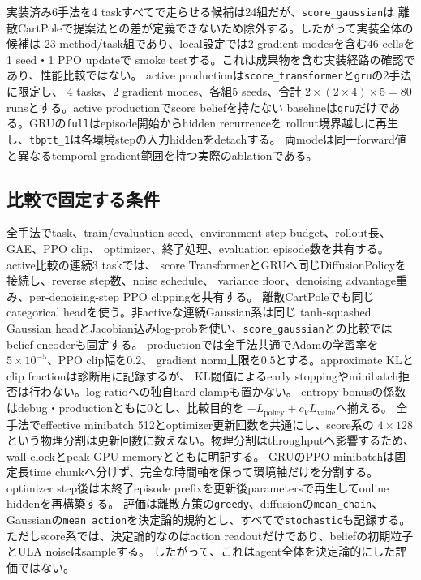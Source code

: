 \documentclass[a4paper,11pt]{article}
\begin{document}
実装済み6手法を4 taskすべてで走らせる候補は24組だが、\texttt{score\_gaussian}は
離散CartPoleで提案法との差が定義できないため除外する。したがって実装全体の候補は
23 method/task組であり、local設定では2 gradient modesを含む46 cellsを1 seed・1 PPO updateで
smoke testする。これは成果物を含む実装経路の確認であり、性能比較ではない。
active productionは\texttt{score\_transformer}と\texttt{gru}の2手法に限定し、
4 tasks、2 gradient modes、各組5 seeds、合計
$2\times(2\times4)\times5=80$ runsとする。active productionでscore beliefを持たない
baselineは\texttt{gru}だけである。GRUの\texttt{full}はepisode開始からhidden recurrenceを
rollout境界越しに再生し、\texttt{tbptt\_1}は各環境stepの入力hiddenをdetachする。
両modeは同一forward値と異なるtemporal gradient範囲を持つ実際のablationである。

\subsection{比較で固定する条件}

全手法でtask、train/evaluation seed、environment step budget、rollout長、GAE、PPO clip、
optimizer、終了処理、evaluation episode数を共有する。active比較の連続3 taskでは、
score TransformerとGRUへ同じDiffusionPolicyを接続し、reverse step数、noise schedule、
variance floor、denoising advantage重み、per-denoising-step PPO clippingを共有する。
離散CartPoleでも同じcategorical headを使う。非activeな連続Gaussian系は同じ
tanh-squashed Gaussian headとJacobian込みlog-probを使い、\texttt{score\_gaussian}との比較では
belief encoderも固定する。
productionでは全手法共通でAdamの学習率を$5\times10^{-5}$、PPO clip幅を$0.2$、
gradient norm上限を$0.5$とする。approximate KLとclip fractionは診断用に記録するが、
KL閾値によるearly stoppingやminibatch拒否は行わない。log ratioへの独自hard clampも置かない。
entropy bonusの係数はdebug・productionともに0とし、比較目的を
$-L_{\mathrm{policy}}+c_VL_{\mathrm{value}}$へ揃える。
全手法でeffective minibatch 512とoptimizer更新回数を共通にし、score系の
$4\times128$という物理分割は更新回数に数えない。物理分割はthroughputへ影響するため、
wall-clockとpeak GPU memoryとともに明記する。
GRUのPPO minibatchは固定長time chunkへ分けず、完全な時間軸を保って環境軸だけを分割する。
optimizer step後は未終了episode prefixを更新後parametersで再生してonline hiddenを再構築する。
評価は離散方策の\texttt{greedy}、diffusionの\texttt{mean\_chain}、
Gaussianの\texttt{mean\_action}を決定論的規約とし、すべてで\texttt{stochastic}も記録する。
ただしscore系では、決定論的なのはaction readoutだけであり、beliefの初期粒子とULA noiseはsampleする。
したがって、これはagent全体を決定論的にした評価ではない。
\end{document}
